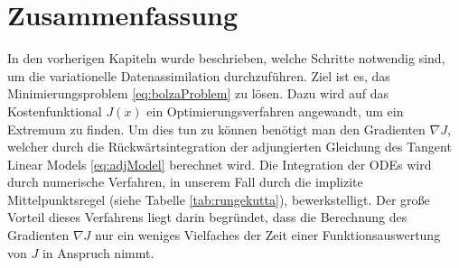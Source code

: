 \section{Zusammenfassung}
In den vorherigen Kapiteln wurde beschrieben, welche Schritte notwendig sind, um die variationelle Datenassimilation durchzuführen.
Ziel ist es, das Minimierungsproblem \eqref{eq:bolzaProblem} zu lösen. Dazu wird auf das Kostenfunktional $J(x)$ ein Optimierungsverfahren angewandt, um ein Extremum zu finden. Um dies tun zu können benötigt man den Gradienten $\nabla J$, welcher durch die Rückwärtsintegration der adjungierten Gleichung des Tangent Linear Models \eqref{eq:adjModel} berechnet wird. Die Integration der ODEs wird durch numerische Verfahren, in unserem Fall durch die implizite Mittelpunktsregel (siehe Tabelle \ref{tab:rungekutta}), bewerkstelligt. Der große Vorteil dieses Verfahrens liegt darin begründet, dass die Berechnung des Gradienten $\nabla J$ nur ein weniges Vielfaches der Zeit einer Funktionsauswertung von $J$ in Anspruch nimmt. 

